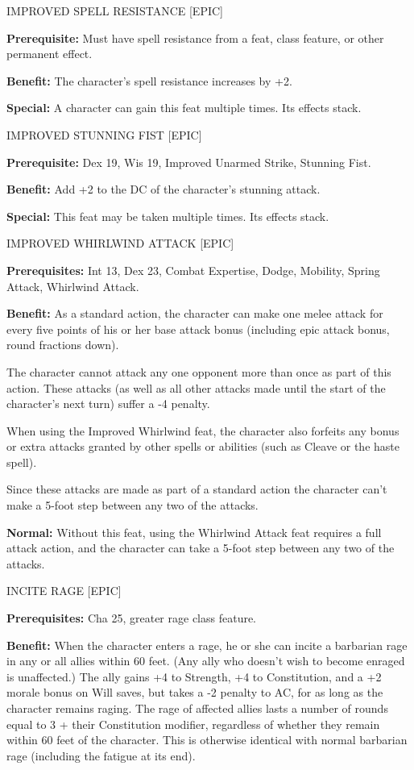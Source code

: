 \documentclass{article}
\begin{document}
\vspace{12pt}
IMPROVED SPELL RESISTANCE [EPIC] 

\textbf{Prerequisite:} Must have spell resistance from a feat, class feature, or 
other permanent effect. 

\textbf{Benefit:} The character's spell resistance increases by +2. 

\textbf{Special:} A character can gain this feat multiple times. Its effects stack. 

\vspace{12pt}
IMPROVED STUNNING FIST [EPIC] 

\textbf{Prerequisite:} Dex 19, Wis 19, Improved Unarmed Strike, Stunning Fist. 

\textbf{Benefit:} Add +2 to the DC of the character's stunning attack. 

\textbf{Special:} This feat may be taken multiple times. Its effects stack. 

\vspace{12pt}
IMPROVED WHIRLWIND ATTACK [EPIC] 

\textbf{Prerequisites:} Int 13, Dex 23, Combat Expertise, Dodge, Mobility, Spring 
Attack, Whirlwind Attack. 

\textbf{Benefit:} As a standard action, the character can make one melee attack 
for every five points of his or her base attack bonus (including epic attack bonus, 
round fractions down).

The character cannot attack any one opponent more than once as part of this action. 
 These attacks (as well as all other attacks made until the start of the character's 
next turn) suffer a -4 penalty.

When using the Improved Whirlwind feat, the character also forfeits any bonus or 
extra attacks granted by other spells or abilities (such as Cleave or the haste 
spell).

Since these attacks are made as part of a standard action the character can't make 
a 5-foot step between any two of the attacks.

\textbf{Normal:} Without this feat, using the Whirlwind Attack feat requires a 
full attack action, and the character can take a 5-foot step between any two of 
the attacks. 

\vspace{12pt}
INCITE RAGE [EPIC] 

\textbf{Prerequisites:} Cha 25, greater rage class feature. 

\textbf{Benefit:} When the character enters a rage, he or she can incite a barbarian 
rage in any or all allies within 60 feet. (Any ally who doesn't wish to become 
enraged is unaffected.) The ally gains +4 to Strength, +4 to Constitution, and 
a +2 morale bonus on Will saves, but takes a -2 penalty to AC, for as long as the 
character remains raging. The rage of affected allies lasts a number of rounds 
equal to 3 + their Constitution modifier, regardless of whether they remain within 
60 feet of the character. This is otherwise identical with normal barbarian rage 
(including the fatigue at its end). 
\end{document}
